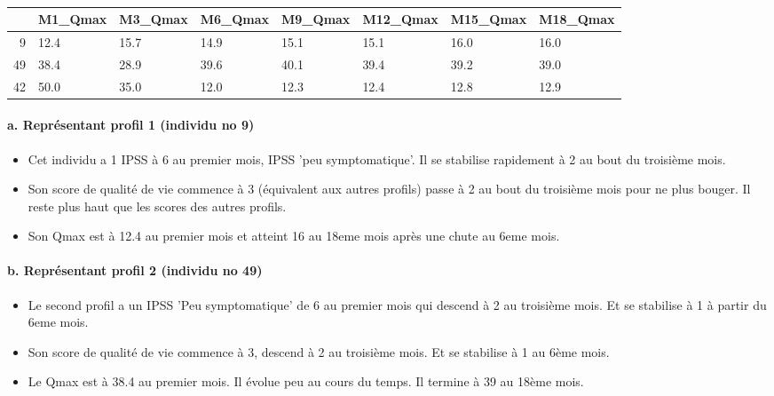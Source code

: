 \documentclass[11pt]{article}
\providecommand{\tightlist}{%
      \setlength{\itemsep}{0pt}\setlength{\parskip}{0pt}}
\begin{document}
\paragraph{}
    
    \begin{tabular}{r|lllllll}
  & M1\_Qmax & M3\_Qmax & M6\_Qmax & M9\_Qmax & M12\_Qmax & M15\_Qmax & M18\_Qmax\\
\hline
	9 & 12.4 & 15.7 & 14.9 & 15.1 & 15.1 & 16.0 & 16.0\\
	49 & 38.4 & 28.9 & 39.6 & 40.1 & 39.4 & 39.2 & 39.0\\
	42 & 50.0 & 35.0 & 12.0 & 12.3 & 12.4 & 12.8 & 12.9\\
\end{tabular}


    
    \paragraph{a. Représentant profil 1 (individu no
9)}\label{a.-repruxe9sentant-profil-1-individu-no-9}

\begin{itemize}
\tightlist
\item
Cet individu a 1 IPSS à 6 au premier mois, IPSS 'peu symptomatique'. Il
se stabilise rapidement à 2 au bout du troisième mois.
\item
Son score de qualité de vie commence à 3 (équivalent aux autres profils)
passe à 2 au bout du troisième mois pour ne plus bouger. Il reste plus
haut que les scores des autres profils.
\item
Son Qmax est à 12.4 au premier mois et atteint 16 au 18eme mois après
une chute au 6eme mois.
\end{itemize}

    \paragraph{b. Représentant profil 2 (individu no
49)}\label{b.-repruxe9sentant-profil-2-individu-no-49}

\begin{itemize}
\tightlist
\item
Le second profil a un IPSS 'Peu symptomatique' de 6 au premier mois qui
descend à 2 au troisième mois. Et se stabilise à 1 à partir du 6eme
mois.
\item
Son score de qualité de vie commence à 3, descend à 2 au troisième mois.
Et se stabilise à 1 au 6ème mois.
\item
Le Qmax est à 38.4 au premier mois. Il évolue peu au cours du temps. Il
termine à 39 au 18ème mois.
\end{itemize}
\end{document}
